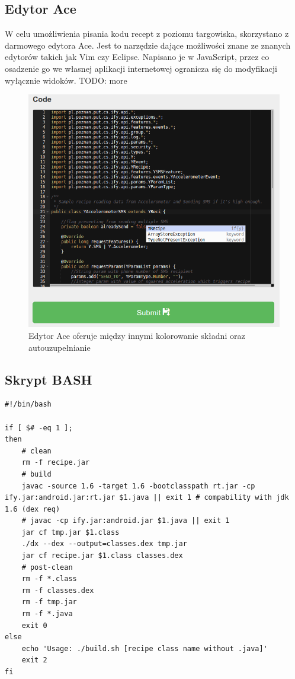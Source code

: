 \documentclass[11pt,a4paper,polish,thesis]{dcsbook}
\begin{document}
\subsection{Edytor Ace}         %
W celu umożliwienia pisania kodu recept z poziomu targowiska, skorzystano z darmowego edytora Ace. Jest to narzędzie dające możliwości znane ze znanych edytorów
takich jak Vim czy Eclipse. Napisano je w JavaScript, przez co osadzenie go we własnej aplikacji internetowej ogranicza się do modyfikacji wyłącznie widoków.
TODO: more
\begin{figure}[p]
  \centering
  \includegraphics[scale=0.6]{./resources/market_ace.png}
  \caption{Edytor Ace oferuje między innymi kolorowanie składni oraz autouzupełnianie}
  \label{fig:market_ace}
\end{figure}
\subsection{Skrypt BASH}       %
\begin{verbatim}
#!/bin/bash

if [ $# -eq 1 ];
then
    # clean
    rm -f recipe.jar
    # build
    javac -source 1.6 -target 1.6 -bootclasspath rt.jar -cp ify.jar:android.jar:rt.jar $1.java || exit 1 # compability with jdk 1.6 (dex req)
    # javac -cp ify.jar:android.jar $1.java || exit 1
    jar cf tmp.jar $1.class
    ./dx --dex --output=classes.dex tmp.jar
    jar cf recipe.jar $1.class classes.dex
    # post-clean
    rm -f *.class
    rm -f classes.dex
    rm -f tmp.jar
    rm -f *.java
    exit 0
else
    echo 'Usage: ./build.sh [recipe class name without .java]'
    exit 2
fi
\end{verbatim}
\end{document}
